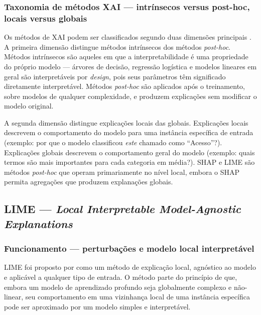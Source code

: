 \documentclass[
    12pt,                %
    openright,           %
    oneside,             %
    a4paper,             %
    english,             %
    brazil               %
]{abntex2}
\begin{document}
\subsubsection{Taxonomia de métodos XAI — intrínsecos versus post-hoc, locais versus globais}
\label{subsubsec:xai_taxonomia}

Os métodos de XAI podem ser classificados segundo duas dimensões principais \cite{salih2023}. A primeira dimensão distingue métodos intrínsecos dos métodos \textit{post-hoc}. Métodos intrínsecos são aqueles em que a interpretabilidade é uma propriedade do próprio modelo — árvores de decisão, regressão logística e modelos lineares em geral são interpretáveis por \textit{design}, pois seus parâmetros têm significado diretamente interpretável. Métodos \textit{post-hoc} são aplicados após o treinamento, sobre modelos de qualquer complexidade, e produzem explicações sem modificar o modelo original.

A segunda dimensão distingue explicações locais das globais. Explicações locais descrevem o comportamento do modelo para uma instância específica de entrada (exemplo: por que o modelo classificou \textit{este} chamado como ``Acesso''?). Explicações globais descrevem o comportamento geral do modelo (exemplo: quais termos são mais importantes para cada categoria em média?). SHAP e LIME são métodos \textit{post-hoc} que operam primariamente no nível local, embora o SHAP permita agregações que produzem explanações globais.

\subsection{LIME — \textit{Local Interpretable Model-Agnostic Explanations}}
\label{subsec:lime}

\subsubsection{Funcionamento — perturbações e modelo local interpretável}
\label{subsubsec:lime_funcionamento}

LIME foi proposto por  como um método de explicação local, agnóstico ao modelo e aplicável a qualquer tipo de entrada. O método parte do princípio de que, embora um modelo de aprendizado profundo seja globalmente complexo e não-linear, seu comportamento em uma vizinhança local de uma instância específica pode ser aproximado por um modelo simples e interpretável.
\end{document}
